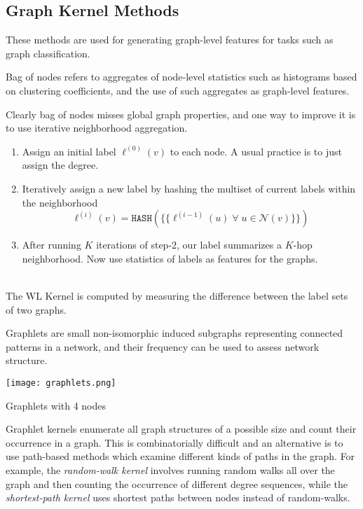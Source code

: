 \subsection{Graph Kernel Methods}
These methods are used for generating graph-level features for tasks such as graph classification.
\begin{definition}
Bag of nodes refers to aggregates of node-level statistics such as histograms based on clustering coefficients, and the use of such aggregates as graph-level features.
\end{definition}
Clearly bag of nodes misses global graph properties, and one way to improve it is to use iterative neighborhood aggregation.\\
    \begin{tcolorbox}[space to upper,
	skin=bicolor,
	colbacklower=black!75,
	collower=white,
	title={Weisfieler–Lehman Algorithm},
	nobeforeafter,
	bottom=0mm,
	height=6.4cm,
	width=4in
	]
	\begin{enumerate}
		\item Assign an initial label $\ell^{(0)}(v)$ to each node. A usual practice is to just assign the degree.
		\item Iteratively assign a new label by hashing the multiset of current labels within the neighborhood $$\ell^{(i)}(v) = \texttt{HASH}(\{\{\ell^{(i-1)}(u)\;\forall\;u \in \mathcal{N}(v)\}\})$$
		\item After running $K$ iterations of step-2, our label summarizes a $K$-hop neighborhood. Now use statistics of labels as features for the graphs.	
	\end{enumerate}
\end{tcolorbox}\\
\noindent The WL Kernel is computed by measuring the difference between the label sets of two graphs.
\begin{definition}[Graphlets]
Graphlets are small non-isomorphic induced subgraphs representing connected patterns in a network, and their frequency can be used to assess network structure.
\end{definition}
\begin{marginfigure}
	\texttt{[image: graphlets.png]}
	\caption{Graphlets with 4 nodes}
	\label{fig:graphlets}
\end{marginfigure}
Graphlet kernels enumerate all graph structures of a possible size and count their occurrence in a graph. This is combinatorially difficult and an alternative is to use path-based methods which examine different kinds of paths in the graph. For example, the \textit{random-walk kernel} \cite{random-walk-kernel} involves running random walks all over the graph and then counting the occurrence of different degree sequences, while the \textit{shortest-path kernel} \cite{shortest-path-kernel} uses shortest paths between nodes instead of random-walks.

